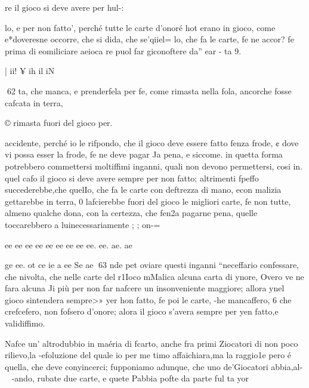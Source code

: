 \documentclass[12pt,a6paper]{article}
\begin{document}
re il gioco si deve avere per hul-:

lo, e per non fatto’, perché tutte le carte d’onoré hot erano
in gioco, come e*doveresne
occorre, che si dida, che se'qiiel=
lo, che fa le carte, fe ne accor?
fe prima di eomiliciare aeioca
re puol far giconoftere da” ear
- ta 9.

 

 
  

 

 

|
ii!
¥
ih
il
iN

 

 

 

 

 
62
ta, che manca, e prenderfela
per fe, come rimasta nella fola,
ancorche fosse cafcata in terra,

© rimasta fuori del gioco per.

accidente, perché io le rifpondo, che il gioco deve essere fatto fenza frode, ¢ dove vi possa
esser la frode, fe ne deve pagar
Ja pena, e siccome. in quetta
forma potrebbero commettersi
moltiffimi inganni, quali non
devono permettersi, cosi in.
quel cafo il gioco si deve avere
sempre per non fatto; altrimenti fpeffo succederebbe,che quelIo, che fa le carte con deftrezza
di mano, econ malizia gettarebbe in terra, 0 lafcierebbe
fuori del gioco le migliori carte, fe non tutte, almeno qualche
dona, con la certezza, che fen2a pagarne pena, quelle toccarebbero a luinecessariamente ;
; on-=

ee ee ee ee ee ee ee ee ee. ee. ae. ae

ge ee. ot ce ie a ee Se ae
63
nde pet oviare questi inganni
“neceffario confessare, che
nivolta, che nelle carte del
r1Ioco mMalica alcuna carta di
ynore, Overo ve ne fara alcuna
Ji più per non far nafcere un insonveniente maggiore; allora
ynel gioco sintendera sempre>»
yer hon fatto, fe poi le carte,
-he mancaffero, 6 che crefcefero, non fofsero d’onore; alora il gioco s’avera sempre per
yen fatto,e validiffimo.

Nafce un’ altrodubbio in maéria di fcarto, anche fra primi
Ziocatori di non poco rilievo,la
-efoluzione del quale io per me
timo affaichiara,ma la raggio1e pero é quella, che deve conyincerci; fupponiamo adunque,
che uno de’Giocatori abbia,al-~
-ando, rubate due carte, e quete Pabbia pofte da parte ful ta
yor
 

 

 

 
\end{document}
